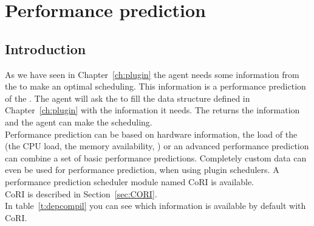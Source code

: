 

\chapter{Performance prediction}
\label{chapter:performance}
\section{Introduction}

As we have seen in Chapter~\ref{ch:plugin} the agent needs some information
from the \sed to make an optimal scheduling. This information is a performance
prediction of the \sed. The agent will ask the \sed to fill the data structure
defined in Chapter~\ref{ch:plugin} with the information it needs. The \sed
returns the information and the agent can make the scheduling.\\ Performance
prediction can be based on hardware information, the load of the \sed (the CPU
load, the memory availability, \etc) or an advanced performance prediction can
combine a set of basic performance predictions. Completely custom data can even be used for performance prediction, when using plugin schedulers. A performance prediction
scheduler module named CoRI  is available.
\\CoRI is described in Section~\ref{sec:CORI}.\\
In table~\ref{t:depcompil} you can see which
information is available by default with CoRI.

